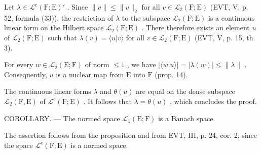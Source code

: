 Let \(\lambda \in \mathcal{L}^{\mathrm{c}}(\mathrm{F};\mathrm{E})'\) . Since \(\| v\| \leqslant \| v\|_{2}\) for all \(v\in \mathcal{L}_2(\mathrm{F};\mathrm{E})\) (EVT, V, p. 52, formula (33)), the restriction of \(\lambda\) to the subspace \(\mathcal{L}_2(\mathrm{F};\mathrm{E})\) is a continuous linear form on the Hilbert space \(\mathcal{L}_2(\mathrm{F};\mathrm{E})\) . There therefore exists an element \(u\) of \(\mathcal{L}_2(\mathrm{F};\mathrm{E})\) such that \(\lambda (v) = \langle u|v\rangle\) for all \(v\in \mathcal{L}_2(\mathrm{F};\mathrm{E})\) (EVT, V, p. 15, th. 3).

For every \(w \in \mathcal{L}_2(\mathrm{E};\mathrm{F})\) of norm \(\leqslant 1\) , we have \(|\langle w|u\rangle| = |\lambda(w)| \leqslant \| \lambda \|\) . Consequently, \(u\) is a nuclear map from \(\mathrm{E}\) into \(\mathrm{F}\) (prop. 14).

The continuous linear forms \(\lambda\) and \(\theta(u)\) are equal on the dense subspace \(\mathcal{L}_{2}(\mathrm{F},\mathrm{E})\) of \(\mathcal{L}^{\mathrm{c}}(\mathrm{F};\mathrm{E})\) . It follows that \(\lambda=\theta(u)\) , which concludes the proof.

COROLLARY. --- The normed space \(\mathcal{L}_{1}(\mathrm{E};\mathrm{F})\) is a Banach space.

The assertion follows from the proposition and from EVT, III, p. 24, cor. 2, since the space \(\mathcal{L}^{\mathrm{c}}(\mathrm{F};\mathrm{E})\) is a normed space.

